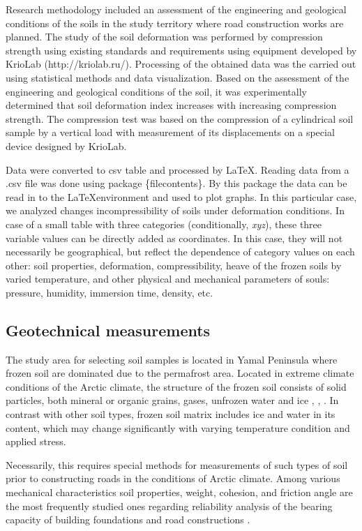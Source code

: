 \documentclass[a4paper,10pt]{article}
\begin{document}
Research methodology included an assessment of the engineering and geological conditions of the soils in the study territory where road construction works are planned. The study of the soil deformation was performed by compression strength using existing standards and requirements using equipment developed by KrioLab (http://kriolab.ru/). Processing of the obtained data was the carried out using statistical methods and data visualization. Based on the assessment of the engineering and geological conditions of the soil, it was experimentally determined that soil deformation index increases with increasing compression strength. The compression test was based on the compression of a cylindrical soil sample by a vertical load with measurement of its displacements on a special device designed by KrioLab. 

Data were converted to csv table and processed by \LaTeX. Reading data from a .csv file was done using package \{filecontents\}. By this package the data can be read in to the \LaTeX \space environment and used to plot graphs. In this particular case, we analyzed changes incompressibility of soils under deformation conditions. In case of a small table with three categories (conditionally, \emph{xyz}), these three variable values can be directly added as coordinates. In this case, they will not necessarily be geographical, but reflect the dependence of category values on each other: soil properties, deformation, compressibility, heave of the frozen soils by varied temperature, and other physical and mechanical parameters of souls: pressure, humidity, immersion time, density, etc.

\subsection{Geotechnical measurements}

The study area for selecting soil samples is located in Yamal Peninsula where frozen soil are dominated due to the permafrost area. Located in extreme climate conditions of the Arctic climate, the structure of the frozen soil consists of solid particles, both mineral or organic grains, gases, unfrozen water and ice \cite{Rathmayer1989}, \cite{Lemenkov2018d}, \cite{AnderstandLananyi}. In contrast with other soil types, frozen soil matrix includes ice and water in its content, which may change significantly with varying temperature condition and applied stress. 

Necessarily, this requires special methods for measurements of such types of soil prior to constructing roads in the conditions of Arctic climate. Among various mechanical characteristics soil properties, weight, cohesion, and friction angle are the most frequently studied ones regarding reliability analysis of the bearing capacity of building foundations and road constructions \cite{Statens2010}. 
\end{document}
